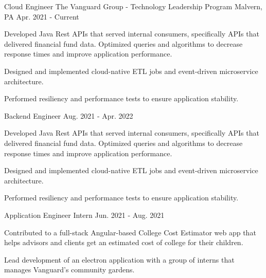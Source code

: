 

\begin{cventries}

  \cventry
    {Cloud Engineer} %
    {The Vanguard Group - Technology Leadership Program} %
    {Malvern, PA} %
    {Apr. 2021 - Current} %
    {
      \begin{cvitems} %
        \item {Developed Java Rest APIs that served internal consumers, specifically APIs that delivered financial fund data. Optimized queries and algorithms to decrease response times and improve application performance.}
        \item {Designed and implemented cloud-native ETL jobs and event-driven microservice architecture.}
        \item {Performed resiliency and performance tests to ensure application stability.}
      \end{cvitems}
    }
  \cventry
    {Backend Engineer} %
    {} %
    {} %
    {Aug. 2021 - Apr. 2022} %
    {
      \begin{cvitems} %
        \item {Developed Java Rest APIs that served internal consumers, specifically APIs that delivered financial fund data. Optimized queries and algorithms to decrease response times and improve application performance.}
        \item {Designed and implemented cloud-native ETL jobs and event-driven microservice architecture.}
        \item {Performed resiliency and performance tests to ensure application stability.}
      \end{cvitems}
    }

  \cventry
    {Application Engineer Intern} %
    {} %
    {} %
    {Jun. 2021 - Aug. 2021} %
    {
      \begin{cvitems} %
        \item {Contributed to a full-stack Angular-based College Cost Estimator web app that helps advisors and clients get an estimated cost of college for their children.}
        \item {Lead development of an electron application with a group of interns that manages Vanguard's community gardens.}
      \end{cvitems}
    }


\end{cventries}

